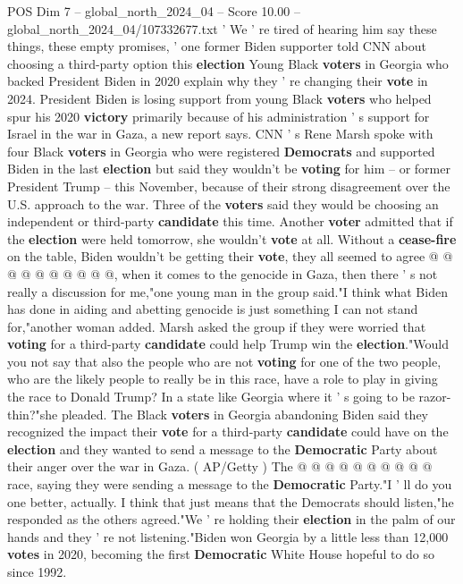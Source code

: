 \begin{textsample}{POS Dim 7 – global\_north\_2024\_04 – Score 10.00 – global\_north\_2024\_04/107332677.txt}  \label{ex:f7_pos_068}
' We ' re tired of hearing him say these things, these empty promises, ' one former Biden supporter told CNN about choosing a third-party option this \textbf{election} Young Black \textbf{voters} in Georgia who backed President Biden in 2020 explain why they ' re changing their \textbf{vote} in 2024.
President Biden is losing support from young Black \textbf{voters} who helped spur his 2020 \textbf{victory} primarily because of his administration ' s support for Israel in the war in Gaza, a new report says.
CNN ' s Rene Marsh spoke with four Black \textbf{voters} in Georgia who were registered \textbf{Democrats} and supported Biden in the last \textbf{election} but said they wouldn't be \textbf{voting} for him -- or former President Trump -- this November, because of their strong disagreement over the U.S. approach to the war.
Three of the \textbf{voters} said they would be choosing an independent or third-party \textbf{candidate} this time.
Another \textbf{voter} admitted that if the \textbf{election} were held tomorrow, she wouldn't \textbf{vote} at all.
Without a \textbf{cease-fire} on the table, Biden wouldn't be getting their \textbf{vote}, they all seemed to agree @ @ @ @ @ @ @ @ @ @, when it comes to the genocide in Gaza, then there ' s not really a discussion for me,"one young man in the group said."I think what Biden has done in aiding and abetting genocide is just something I can not stand for,"another woman added.
Marsh asked the group if they were worried that \textbf{voting} for a third-party \textbf{candidate} could help Trump win the \textbf{election}."Would you not say that also the people who are not \textbf{voting} for one of the two people, who are the likely people to really be in this race, have a role to play in giving the race to Donald Trump?
In a state like Georgia where it ' s going to be razor-thin?"she pleaded.
The Black \textbf{voters} in Georgia abandoning Biden said they recognized the impact their \textbf{vote} for a third-party \textbf{candidate} could have on the \textbf{election} and they wanted to send a message to the \textbf{Democratic} Party about their anger over the war in Gaza. ( AP/Getty ) The @ @ @ @ @ @ @ @ @ @ race, saying they were sending a message to the \textbf{Democratic} Party."I ' ll do you one better, actually.
I think that just means that the Democrats should listen,"he responded as the others agreed."We ' re holding their \textbf{election} in the palm of our hands and they ' re not listening."Biden won Georgia by a little less than 12,000 \textbf{votes} in 2020, becoming the first \textbf{Democratic} White House hopeful to do so since 1992.

\end{textsample}
